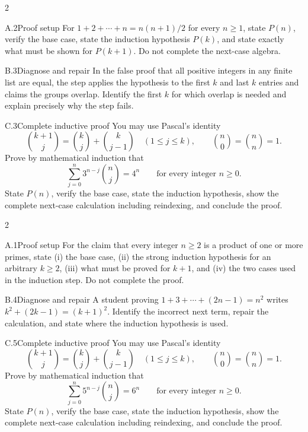 \documentclass[9pt]{extarticle}
\begin{document}
\CoreWorkArea
\FormBreak
{}
\begin{multicols}{2}
\begin{CompactCoreProblem}{A.2}{Proof setup}
For $1+2+\cdots+n=n(n+1)/2$ for every $n\ge1$, state $P(n)$, verify the base case, state the induction hypothesis $P(k)$, and state exactly what must be shown for $P(k+1)$. Do not complete the next-case algebra.
\end{CompactCoreProblem}
\begin{CompactCoreProblem}{B.3}{Diagnose and repair}
In the false proof that all positive integers in any finite list are equal, the step applies the hypothesis to the first $k$ and last $k$ entries and claims the groups overlap. Identify the first $k$ for which overlap is needed and explain precisely why the step fails.
\end{CompactCoreProblem}
\end{multicols}
\begin{CompactCoreProblem}{C.3}{Complete inductive proof}
You may use Pascal's identity
\[
\binom{k+1}{j}=\binom{k}{j}+\binom{k}{j-1}
\quad(1\le j\le k),\qquad
\binom{n}{0}=\binom{n}{n}=1.
\]
Prove by mathematical induction that
\[
\sum_{j=0}^{n} 3^{n-j}\binom{n}{j}=4^n\qquad\text{for every integer }n\ge0.
\]
State $P(n)$, verify the base case, state the induction hypothesis, show the complete next-case calculation including reindexing, and conclude the proof.
\end{CompactCoreProblem}
\CoreWorkArea
\FormBreak
{}
\begin{multicols}{2}
\begin{CompactCoreProblem}{A.1}{Proof setup}
For the claim that every integer $n\ge2$ is a product of one or more primes, state (i) the base case, (ii) the strong induction hypothesis for an arbitrary $k\ge2$, (iii) what must be proved for $k+1$, and (iv) the two cases used in the induction step. Do not complete the proof.
\end{CompactCoreProblem}
\begin{CompactCoreProblem}{B.4}{Diagnose and repair}
A student proving $1+3+\cdots+(2n-1)=n^2$ writes $k^2+(2k-1)=(k+1)^2$. Identify the incorrect next term, repair the calculation, and state where the induction hypothesis is used.
\end{CompactCoreProblem}
\end{multicols}
\begin{CompactCoreProblem}{C.5}{Complete inductive proof}
You may use Pascal's identity
\[
\binom{k+1}{j}=\binom{k}{j}+\binom{k}{j-1}
\quad(1\le j\le k),\qquad
\binom{n}{0}=\binom{n}{n}=1.
\]
Prove by mathematical induction that
\[
\sum_{j=0}^{n} 5^{n-j}\binom{n}{j}=6^n\qquad\text{for every integer }n\ge0.
\]
State $P(n)$, verify the base case, state the induction hypothesis, show the complete next-case calculation including reindexing, and conclude the proof.
\end{CompactCoreProblem}
\end{document}
